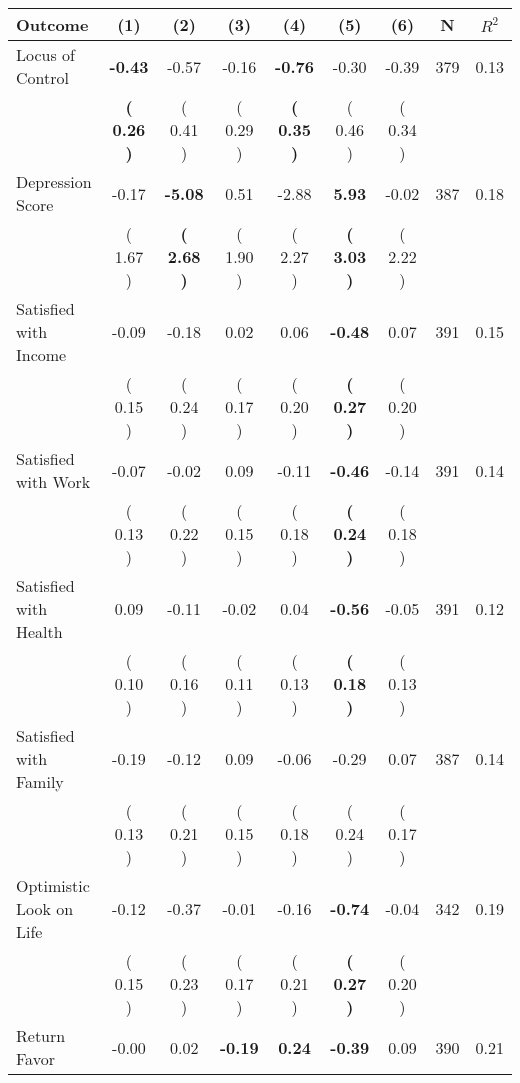 \begin{tabular}{lcccccccc}
\toprule
 \textbf{Outcome} & \textbf{(1)} & \textbf{(2)} & \textbf{(3)} & \textbf{(4)} & \textbf{(5)} & \textbf{(6)} & \textbf{N} & \textbf{$ R^2$} \\
\midrule
Locus of Control & \textbf{    -0.43} &     -0.57 &     -0.16 & \textbf{    -0.76} &     -0.30 &     -0.39 & 379 &       0.13 \\ 
 & \textbf{(     0.26 )} & (     0.41 ) & (     0.29 ) & \textbf{(     0.35 )} & (     0.46 ) & (     0.34 ) & \\
Depression Score &     -0.17 & \textbf{    -5.08} &      0.51 &     -2.88 & \textbf{     5.93} &     -0.02 & 387 &       0.18 \\ 
 & (     1.67 ) & \textbf{(     2.68 )} & (     1.90 ) & (     2.27 ) & \textbf{(     3.03 )} & (     2.22 ) & \\
Satisfied with Income &     -0.09 &     -0.18 &      0.02 &      0.06 & \textbf{    -0.48} &      0.07 & 391 &       0.15 \\ 
 & (     0.15 ) & (     0.24 ) & (     0.17 ) & (     0.20 ) & \textbf{(     0.27 )} & (     0.20 ) & \\
Satisfied with Work &     -0.07 &     -0.02 &      0.09 &     -0.11 & \textbf{    -0.46} &     -0.14 & 391 &       0.14 \\ 
 & (     0.13 ) & (     0.22 ) & (     0.15 ) & (     0.18 ) & \textbf{(     0.24 )} & (     0.18 ) & \\
Satisfied with Health &      0.09 &     -0.11 &     -0.02 &      0.04 & \textbf{    -0.56} &     -0.05 & 391 &       0.12 \\ 
 & (     0.10 ) & (     0.16 ) & (     0.11 ) & (     0.13 ) & \textbf{(     0.18 )} & (     0.13 ) & \\
Satisfied with Family &     -0.19 &     -0.12 &      0.09 &     -0.06 &     -0.29 &      0.07 & 387 &       0.14 \\ 
 & (     0.13 ) & (     0.21 ) & (     0.15 ) & (     0.18 ) & (     0.24 ) & (     0.17 ) & \\
Optimistic Look on Life &     -0.12 &     -0.37 &     -0.01 &     -0.16 & \textbf{    -0.74} &     -0.04 & 342 &       0.19 \\ 
 & (     0.15 ) & (     0.23 ) & (     0.17 ) & (     0.21 ) & \textbf{(     0.27 )} & (     0.20 ) & \\
Return Favor &     -0.00 &      0.02 & \textbf{    -0.19} & \textbf{     0.24} & \textbf{    -0.39} &      0.09 & 390 &       0.21 \\ 

\end{tabular}
